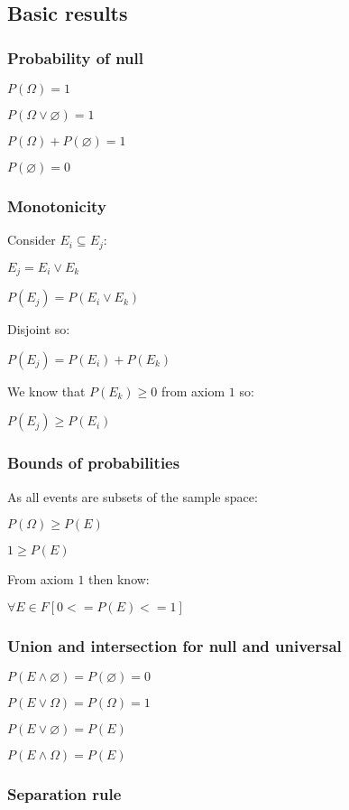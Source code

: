 
\subsection{Basic results}

\subsubsection{Probability of null}

$P(\Omega )=1$

$P(\Omega \lor \varnothing )=1$

$P(\Omega )+P(\varnothing )=1$

$P(\varnothing )=0$

\subsubsection{Monotonicity}

Consider \(E_i\subseteq E_j\):

$E_j=E_i\lor E_k$

$P(E_j)=P(E_i\lor E_k)$

Disjoint so:

$P(E_j)=P(E_i)+P(E_k)$

We know that \(P(E_k)\ge 0\) from axiom \(1\) so:

$P(E_j)\ge P(E_i)$

\subsubsection{Bounds of probabilities}

As all events are subsets of the sample space:

$P(\Omega )\ge P(E)$

$1\ge P(E)$

From axiom \(1\) then know:

\(\forall E\in F [0<=P(E)<=1]\)

\subsubsection{Union and intersection for null and universal}

$P(E\land \varnothing )=P(\varnothing )=0$

$P(E\lor \Omega )=P(\Omega )=1$

$P(E\lor \varnothing)=P(E)$

$P(E\land \Omega )=P(E)$

\subsubsection{Separation rule}


